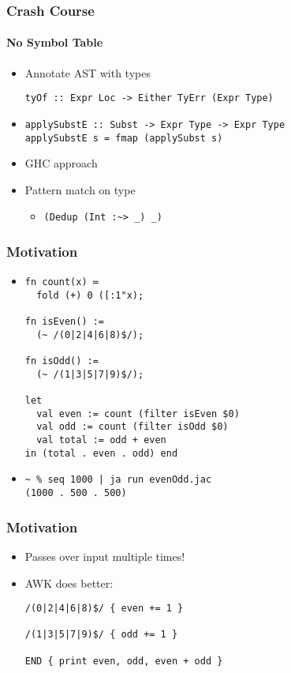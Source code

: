 \documentclass{beamer}
\begin{document}
\begin{frame}[fragile]
  \frametitle{Crash Course}
  \framesubtitle{No Symbol Table}
  \begin{itemize}
      \item Annotate AST with types
        \begin{verbatim}
tyOf :: Expr Loc -> Either TyErr (Expr Type)
        \end{verbatim}
      \item
        \begin{verbatim}
applySubstE :: Subst -> Expr Type -> Expr Type
applySubstE s = fmap (applySubst s)
        \end{verbatim}
      \item GHC approach
      \item Pattern match on type
        \begin{itemize}
          \item \verb|(Dedup (Int :~> _) _)|
        \end{itemize}
  \end{itemize}
\end{frame}

\begin{frame}[fragile]
  \frametitle{Motivation}
  \begin{itemize}
    \item
      \begin{verbatim}
fn count(x) ≔
  fold (+) 0 ([:1"x);

fn isEven() :=
  (~ /(0|2|4|6|8)$/);

fn isOdd() :=
  (~ /(1|3|5|7|9)$/);

let
  val even := count (filter isEven $0)
  val odd := count (filter isOdd $0)
  val total := odd + even
in (total . even . odd) end
      \end{verbatim}
    \item
      \begin{verbatim}
~ % seq 1000 | ja run evenOdd.jac
(1000 . 500 . 500)
      \end{verbatim}
  \end{itemize}
\end{frame}
\begin{frame}[fragile]
  \frametitle{Motivation}
  \begin{itemize}
    \item Passes over input multiple times!
    \item AWK does better:
      \begin{verbatim}
/(0|2|4|6|8)$/ { even += 1 } 

/(1|3|5|7|9)$/ { odd += 1 } 

END { print even, odd, even + odd }
      \end{verbatim}
  \end{itemize}
\end{frame}
\end{document}
